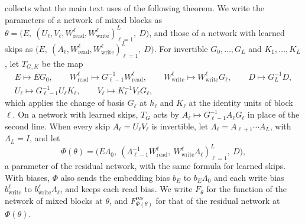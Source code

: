 \documentclass[10pt]{article}
\theoremstyle{definition}
\theoremstyle{remark}
\newcommand{\Wread}{W_{\mathrm{read}}}
\newcommand{\Wwrite}{W_{\mathrm{write}}}
\begin{document}
 collects what the main text uses of the following theorem. We write the parameters of a network of mixed blocks as $\theta = \big(E,\ (U_\ell, V_\ell, \Wread^{\ell}, \Wwrite^{\ell})_{\ell=1}^{L},\ D\big)$, and those of a network with learned skips as $\big(E,\ (A_\ell, \Wread^{\ell}, \Wwrite^{\ell})_{\ell=1}^{L},\ D\big)$. For invertible $G_0, \dots, G_L$ and $K_1, \dots, K_L$, let $T_{G,K}$ be the map
\begin{equation}\label{eq:gaugeact}
\begin{gathered}
E \mapsto EG_0, \qquad \Wread^{\ell} \mapsto G_{\ell-1}^{-1}\Wread^{\ell}, \qquad \Wwrite^{\ell} \mapsto \Wwrite^{\ell}G_\ell, \qquad D \mapsto G_L^{-1}D,\\
U_\ell \mapsto G_{\ell-1}^{-1}U_\ell K_\ell, \qquad V_\ell \mapsto K_\ell^{-1}V_\ell G_\ell,
\end{gathered}
\end{equation}
which applies the change of basis $G_\ell$ at $h_\ell$ and $K_\ell$ at the identity units of block $\ell$. On a network with learned skips, $T_G$ acts by $A_\ell \mapsto G_{\ell-1}^{-1}A_\ell G_\ell$ in place of the second line. When every skip $A_\ell = U_\ell V_\ell$ is invertible, let $\Lambda_\ell = A_{\ell+1}\cdots A_L$, with $\Lambda_L = I$, and let
\begin{equation}\label{eq:gaugemap}
\Phi(\theta) = \big(E\Lambda_0,\ (\Lambda_{\ell-1}^{-1}\Wread^{\ell},\ \Wwrite^{\ell}\Lambda_\ell)_{\ell=1}^{L},\ D\big),
\end{equation}
a parameter of the residual network, with the same formula for learned skips. With biases, $\Phi$ also sends the embedding bias $b_E$ to $b_E\Lambda_0$ and each write bias $b^{\ell}_{\mathrm{write}}$ to $b^{\ell}_{\mathrm{write}}\Lambda_\ell$, and keeps each read bias. We write $F_\theta$ for the function of the network of mixed blocks at $\theta$, and $F^{\mathrm{res}}_{\Phi(\theta)}$ for that of the residual network at $\Phi(\theta)$.
\end{document}
